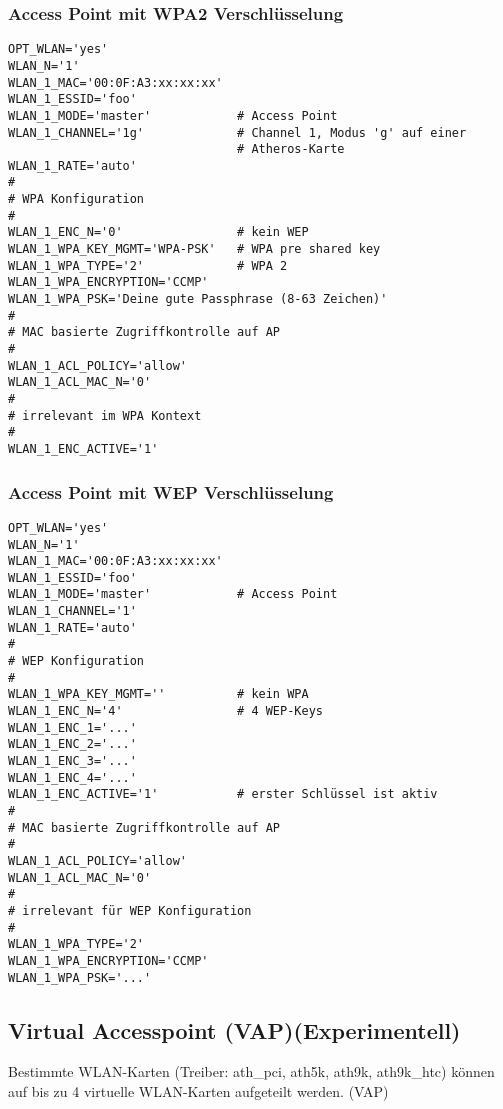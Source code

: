 \subsubsection{Access Point mit WPA2 Verschlüsselung}

\begin{example}
\begin{verbatim}
OPT_WLAN='yes'
WLAN_N='1'
WLAN_1_MAC='00:0F:A3:xx:xx:xx'
WLAN_1_ESSID='foo'
WLAN_1_MODE='master'            # Access Point
WLAN_1_CHANNEL='1g'             # Channel 1, Modus 'g' auf einer
                                # Atheros-Karte
WLAN_1_RATE='auto'
#
# WPA Konfiguration
#
WLAN_1_ENC_N='0'                # kein WEP
WLAN_1_WPA_KEY_MGMT='WPA-PSK'   # WPA pre shared key
WLAN_1_WPA_TYPE='2'             # WPA 2
WLAN_1_WPA_ENCRYPTION='CCMP'
WLAN_1_WPA_PSK='Deine gute Passphrase (8-63 Zeichen)'
#
# MAC basierte Zugriffkontrolle auf AP
#
WLAN_1_ACL_POLICY='allow'
WLAN_1_ACL_MAC_N='0'
#
# irrelevant im WPA Kontext
#
WLAN_1_ENC_ACTIVE='1'
\end{verbatim}
\end{example}

\subsubsection{Access Point mit WEP Verschlüsselung}
\begin{example}
\begin{verbatim}
OPT_WLAN='yes'
WLAN_N='1'
WLAN_1_MAC='00:0F:A3:xx:xx:xx'
WLAN_1_ESSID='foo'
WLAN_1_MODE='master'            # Access Point
WLAN_1_CHANNEL='1'
WLAN_1_RATE='auto'
#
# WEP Konfiguration
#
WLAN_1_WPA_KEY_MGMT=''          # kein WPA 
WLAN_1_ENC_N='4'                # 4 WEP-Keys
WLAN_1_ENC_1='...'
WLAN_1_ENC_2='...'
WLAN_1_ENC_3='...'
WLAN_1_ENC_4='...'
WLAN_1_ENC_ACTIVE='1'           # erster Schlüssel ist aktiv
#
# MAC basierte Zugriffkontrolle auf AP
#
WLAN_1_ACL_POLICY='allow'
WLAN_1_ACL_MAC_N='0'
# 
# irrelevant für WEP Konfiguration
#
WLAN_1_WPA_TYPE='2'
WLAN_1_WPA_ENCRYPTION='CCMP'
WLAN_1_WPA_PSK='...'

\end{verbatim}
\end{example}

\subsection{Virtual Accesspoint (VAP)(Experimentell)}

Bestimmte WLAN-Karten (Treiber: ath\_pci, ath5k, ath9k, ath9k\_htc) können auf bis zu 4 virtuelle WLAN-Karten aufgeteilt werden. (VAP)

